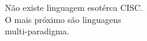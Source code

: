 \documentclass[preview]{standalone}
\begin{document}
Não existe linguagem esotérca CISC.\\O mais próximo são linguagens\\multi-paradigma.\\
\end{document}
